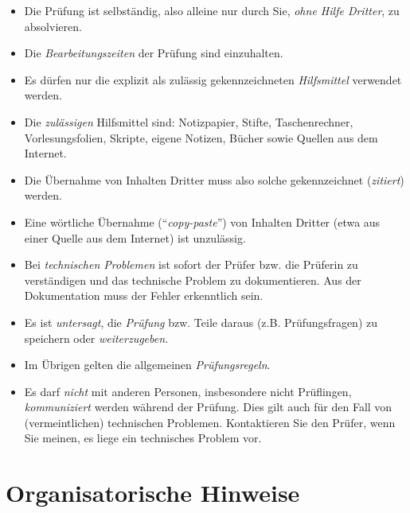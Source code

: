 \documentclass[
  a4paper,
  DIV=11]{scrreprt}
\providecommand{\tightlist}{%
  \setlength{\itemsep}{0pt}\setlength{\parskip}{0pt}}\usepackage{longtable,booktabs,array}
\theoremstyle{definition}
\theoremstyle{remark}
\begin{document}
\begin{itemize}
\tightlist
\item
  Die Prüfung ist selbständig, also alleine nur durch Sie, \emph{ohne
  Hilfe Dritter}, zu absolvieren.
\item
  Die \emph{Bearbeitungszeiten} der Prüfung sind einzuhalten.
\item
  Es dürfen nur die explizit als zulässig gekennzeichneten
  \emph{Hilfsmittel} verwendet werden.
\item
  Die \emph{zulässigen} Hilfsmittel sind: Notizpapier, Stifte,
  Taschenrechner, Vorlesungsfolien, Skripte, eigene Notizen, Bücher
  sowie Quellen aus dem Internet.
\item
  Die Übernahme von Inhalten Dritter muss also solche gekennzeichnet
  (\emph{zitiert}) werden.
\item
  Eine wörtliche Übernahme (``\emph{copy-paste}'') von Inhalten Dritter
  (etwa aus einer Quelle aus dem Internet) ist unzulässig.
\item
  Bei \emph{technischen Problemen} ist sofort der Prüfer bzw. die
  Prüferin zu verständigen und das technische Problem zu dokumentieren.
  Aus der Dokumentation muss der Fehler erkenntlich sein.
\item
  Es ist \emph{untersagt}, die \emph{Prüfung} bzw. Teile daraus (z.B.
  Prüfungsfragen) zu speichern oder \emph{weiterzugeben.}
\item
  Im Übrigen gelten die allgemeinen \emph{Prüfungsregeln}.
\item
  Es darf \emph{nicht} mit anderen Personen, insbesondere nicht
  Prüflingen, \emph{kommuniziert} werden während der Prüfung. Dies gilt
  auch für den Fall von (vermeintlichen) technischen Problemen.
  Kontaktieren Sie den Prüfer, wenn Sie meinen, es liege ein technisches
  Problem vor.
\end{itemize}

\hypertarget{organisatorische-hinweise}{%
\section{Organisatorische Hinweise}\label{organisatorische-hinweise}}
\end{document}
